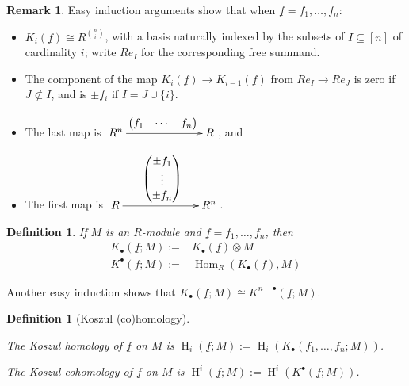 \documentclass[11pt]{book}
\newtheorem{definition}[theorem]{Definition}
\numberwithin{equation}{section}
\numberwithin{theorem}{chapter}
\theoremstyle{definition}
\newtheorem*{basic properties}{Basic Properties}
\newtheorem*{Important Remark}{Important Remark}
\newtheorem{remark}[theorem]{Remark}
\theoremstyle{remark}
\newcommand{\Hom}{\operatorname{Hom}}
\renewcommand{\H}{\operatorname{H}}
\begin{document}
\

\begin{remark} Easy induction arguments show that when $\underline{f} = f_1, \ldots, f_n$:
\begin{itemize}
	\item $K_i(\underline{f}) \cong R^{{n \choose i}}$, with a basis naturally indexed by the subsets of $I\subseteq [n]$ of cardinality $i$; write $R e_I$ for the corresponding free summand.
	\item The component of the map $K_i(\underline{f})\to K_{i-1}(\underline{f})$ from $R e_I \to R e_J$ is zero if $J \not\subset I$, and is $\pm f_i$ if $I=J\cup \{i\}$.

	\item The last map is $\xymatrix@C=24mm{R^n \ar[r]^{\begin{pmatrix} f_1 & \cdots & f_n \end{pmatrix}} & R}$, and
	\item The first map is $\xymatrix@C=24mm{R \ar[r]^{\begin{pmatrix} \pm f_1 \\ \vdots \\ \pm f_n \end{pmatrix}} & R^n}$.
\end{itemize}
\end{remark}


\begin{definition}
If $M$ is an $R$-module and $\underline{f} = f_1, \ldots, f_n$, then
\begin{align*}
K_\bullet(\underline{f};M) := & K_\bullet(\underline{f}) \otimes M \\ 
K^\bullet(\underline{f};M) := & \Hom_R( K_\bullet(\underline{f}), M)
\end{align*}
\end{definition}


Another easy induction shows that $K_\bullet(\underline{f};M) \cong K^{n-\bullet}(\underline{f};M)$.


\begin{definition}[Koszul (co)homology]\index{$\H_i(\underline{f};M)$}$\,$

	The Koszul homology of $\underline{f}$ on $M$ is $\H_i(\underline{f};M)  := \H_i(K_\bullet(f_1, \ldots, f_n; M))$.
	
	The Koszul cohomology of $\underline{f}$ on $M$ is $\H^i(\underline{f};M):=\H^i(K^\bullet(\underline{f}; M))$.
\end{definition}
\end{document}
